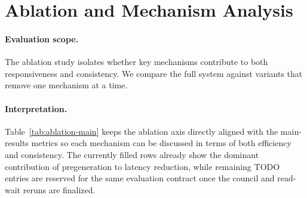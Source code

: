 \section{Ablation and Mechanism Analysis}
\label{sec:ablation}

\paragraph{Evaluation scope.}
The ablation study isolates whether key mechanisms contribute to both responsiveness and consistency. We compare the full system against variants that remove one mechanism at a time.

\begin{table}[t]
\centering
\small
{}
\caption{Ablation summary for mechanism contribution. The table isolates the effect of pregeneration, council planning, and read-wait strategy under aligned metrics. Pending artifact path: \texttt{[PATH\_TO\_ABLATION\_SUMMARY\_CSV]}.}
\label{tab:ablation-main}
\end{table}

\paragraph{Interpretation.}
Table~\ref{tab:ablation-main} keeps the ablation axis directly aligned with the main-results metrics so each mechanism can be discussed in terms of both efficiency and consistency. The currently filled rows already show the dominant contribution of pregeneration to latency reduction, while remaining TODO entries are reserved for the same evaluation contract once the council and read-wait reruns are finalized.
